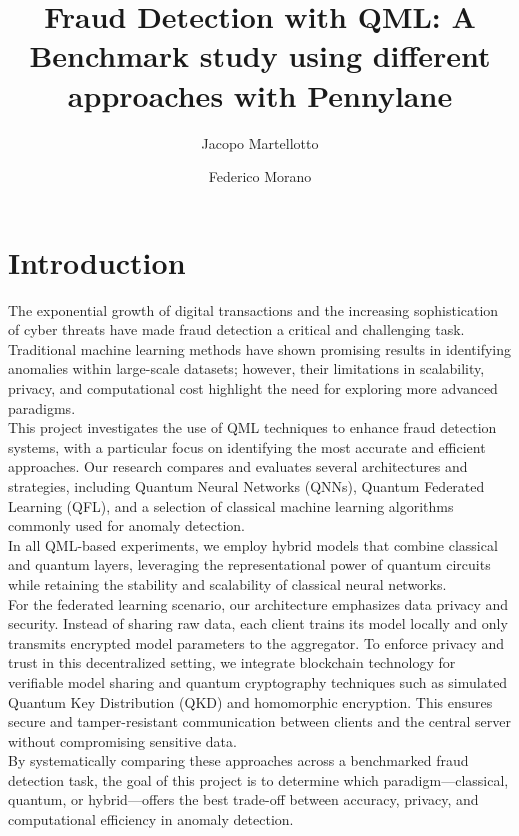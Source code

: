 \documentclass[10pt]{article}
\title{\textbf{Fraud Detection with QML: A Benchmark study using different approaches with Pennylane}}
\author[1]{Jacopo Martellotto}
\affil[1]{\small\texttt{j.martellotto@studenti.unipi.it}}
\date{}
\author[2]{Federico Morano}
\affil[2]{\small\texttt{f.morano1@studenti.unipi.it}}
\date{}
\begin{document}
\maketitle

\section{Introduction}
The exponential growth of digital transactions and the increasing sophistication of cyber threats have made fraud detection a critical and challenging task. Traditional machine learning methods have shown promising results in identifying anomalies within large-scale datasets; however, their limitations in scalability, privacy, and computational cost highlight the need for exploring more advanced paradigms.\\
This project investigates the use of QML techniques to enhance fraud detection systems, with a particular focus on identifying the most accurate and efficient approaches. Our research compares and evaluates several architectures and strategies, including Quantum Neural Networks (QNNs), Quantum Federated Learning (QFL), and a selection of classical machine learning algorithms commonly used for anomaly detection.\\
In all QML-based experiments, we employ hybrid models that combine classical and quantum layers, leveraging the representational power of quantum circuits while retaining the stability and scalability of classical neural networks.\\
For the federated learning scenario, our architecture emphasizes data privacy and security. Instead of sharing raw data, each client trains its model locally and only transmits encrypted model parameters to the aggregator. To enforce privacy and trust in this decentralized setting, we integrate blockchain technology for verifiable model sharing and quantum cryptography techniques such as simulated Quantum Key Distribution (QKD) and homomorphic encryption. This ensures secure and tamper-resistant communication between clients and the central server without compromising sensitive data.\\
By systematically comparing these approaches across a benchmarked fraud detection task, the goal of this project is to determine which paradigm—classical, quantum, or hybrid—offers the best trade-off between accuracy, privacy, and computational efficiency in anomaly detection.
\end{document}

